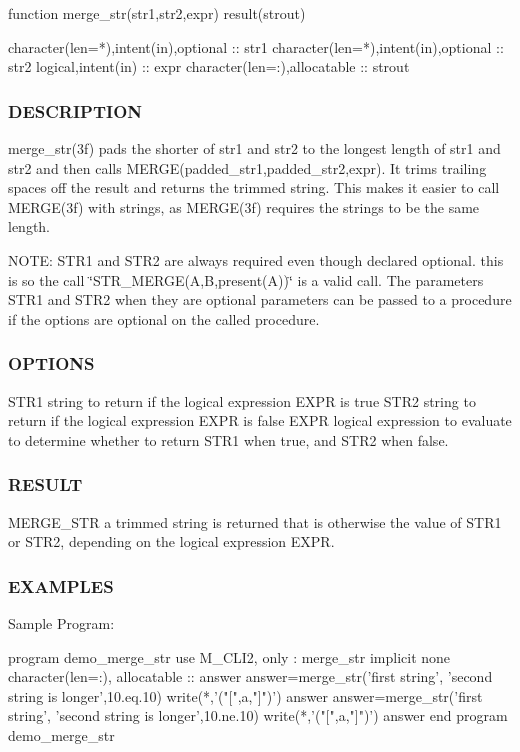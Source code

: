 \begin{DoxyVerb}function merge_str(str1,str2,expr) result(strout)

 character(len=*),intent(in),optional :: str1
 character(len=*),intent(in),optional :: str2
 logical,intent(in)              :: expr
 character(len=:),allocatable    :: strout
\end{DoxyVerb}
 \subsubsection*{D\+E\+S\+C\+R\+I\+P\+T\+I\+ON}

merge\+\_\+str(3f) pads the shorter of str1 and str2 to the longest length of str1 and str2 and then calls M\+E\+R\+G\+E(padded\+\_\+str1,padded\+\_\+str2,expr). It trims trailing spaces off the result and returns the trimmed string. This makes it easier to call M\+E\+R\+G\+E(3f) with strings, as M\+E\+R\+G\+E(3f) requires the strings to be the same length.

N\+O\+TE\+: S\+T\+R1 and S\+T\+R2 are always required even though declared optional. this is so the call \char`\"{}\+S\+T\+R\+\_\+\+M\+E\+R\+G\+E(\+A,\+B,present(\+A))\char`\"{} is a valid call. The parameters S\+T\+R1 and S\+T\+R2 when they are optional parameters can be passed to a procedure if the options are optional on the called procedure.

\subsubsection*{O\+P\+T\+I\+O\+NS}

S\+T\+R1 string to return if the logical expression E\+X\+PR is true S\+T\+R2 string to return if the logical expression E\+X\+PR is false E\+X\+PR logical expression to evaluate to determine whether to return S\+T\+R1 when true, and S\+T\+R2 when false. \subsubsection*{R\+E\+S\+U\+LT}

M\+E\+R\+G\+E\+\_\+\+S\+TR a trimmed string is returned that is otherwise the value of S\+T\+R1 or S\+T\+R2, depending on the logical expression E\+X\+PR.

\subsubsection*{E\+X\+A\+M\+P\+L\+ES}

Sample Program\+: \begin{DoxyVerb}program demo_merge_str
use M_CLI2, only : merge_str
implicit none
character(len=:), allocatable :: answer
   answer=merge_str('first string', 'second string is longer',10.eq.10)
   write(*,'("[",a,"]")') answer
   answer=merge_str('first string', 'second string is longer',10.ne.10)
   write(*,'("[",a,"]")') answer
end program demo_merge_str
\end{DoxyVerb}


